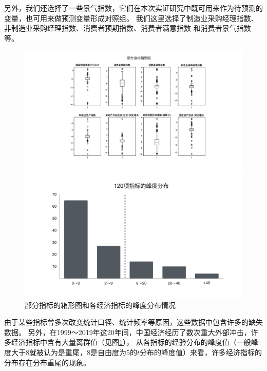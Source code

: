 另外，我们还选择了一些景气指数，它们在本次实证研究中既可用来作为待预测的变量，也可用来做预测变量形成对照组。
我们这里选择了制造业采购经理指数、非制造业采购经理指数、消费者预期指数、消费者满意指数
和消费者景气指数等。

\begin{figure}[H]
    \flushleft
    \begin{minipage}[t]{1\textwidth}
    \includegraphics[width=14cm]{pics/chapter2/box.pdf}
    \end{minipage}
    \begin{minipage}[t]{1\textwidth}
    \centering
    \includegraphics[width=12cm]{pics/chapter2/skew.pdf}
    \end{minipage}
    \caption{\small 部分指标的箱形图和各经济指标的峰度分布情况}
    \label{desc}
\end{figure}

由于某些指标曾多次改变统计口径、统计频率等原因，这些数据中包含许多的缺失数据。
另外，在1999～2019年这20年间，中国经济经历了数次重大外部冲击，许多经济指标中含有大量离群值（见图\ref{desc}），
从各指标的经验分布的峰度值（一般峰度大于8就被认为是重尾，8是自由度为5的$t$分布的峰度值）来看，许多经济指标的分布存在分布重尾的现象。

